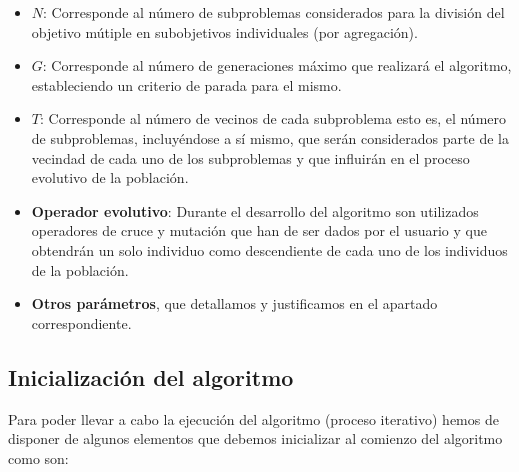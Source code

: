 \begin{itemize}

	\item \textbf{$N$}: Corresponde al número de subproblemas considerados para la división del objetivo mútiple en subobjetivos individuales (por agregación).\\
	
	\item \textbf{$G$}: Corresponde al número de generaciones máximo que realizará el algoritmo, estableciendo un criterio de parada para el mismo.\\
	  
    \item \textbf{$T$}: Corresponde al número de vecinos de cada subproblema esto es, el número de subproblemas, incluyéndose a sí mismo, que serán considerados parte de la vecindad de cada uno de los subproblemas y que influirán en el proceso evolutivo de la población.\\
    
	\item \textbf{Operador evolutivo}: Durante el desarrollo del algoritmo son utilizados operadores de cruce y mutación que han de ser dados por el usuario y que obtendrán un solo individuo como descendiente de cada uno de los individuos de la población.\\
    
	\item \textbf{Otros parámetros}, que detallamos y justificamos en el apartado correspondiente.\\
\end{itemize}

\subsection{Inicialización del algoritmo}

Para poder llevar a cabo la ejecución del algoritmo (proceso iterativo) hemos de disponer de algunos elementos que debemos inicializar al comienzo del algoritmo como son: \\

